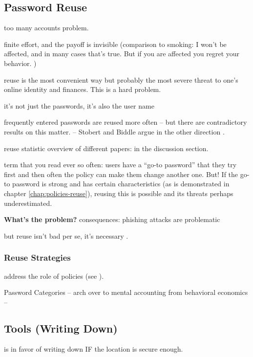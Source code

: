 	


	\subsection{Password Reuse}
	too many accounts problem. 
	
	finite effort, and the payoff is invisible (comparison to smoking: I won't be affected, and in many cases that's true. But if you are affected you regret your behavior. )
	
	reuse is the most convenient way but probably the most severe threat to one's online identity and finances. This is a hard problem. 
	
	it's not just the passwords, it's also the user name 
	
	frequently entered passwords are reused more often \cite{Wash2016UnderstandingPasswordChoices} -- but there are contradictory results on this matter. -- Stobert and Biddle argue in the other direction \cite{Stobert2014PasswordLifeCycle}. 
	
	reuse statistic overview of different papers: \cite{Wash2016UnderstandingPasswordChoices} in the discussion section. 
	
	term that you read ever so often: users have a ``go-to password'' that they try first
	and then often the policy can make them change another one. But! If the go-to password is strong and has certain characteristics (as is demonstrated in chapter \ref{chap:policies-reuse}), reusing this is possible and its threats perhaps underestimated. 
	
	\textbf{What's the problem?}
	consequences: phishing attacks are problematic
	
	but reuse isn't bad per se, it's necessary \cite{Florencio2014PasswordPortfoliosFiniteUser, ZhangKennedy2016RevisitingPasswordRules}. 
	
	
	
	
	\subsubsection{Reuse Strategies}
	address the role of policies (see \cite{Seitz2017PoliciesReuse}).
	
	Password Categories -- arch over to mental accounting from behavioral economics -- \cite{Thaler2004}
	
	\cite{Stobert2015ExpertPassword}
	
	
	\subsection{Tools (Writing Down)}
	\cite{Herley2012PersistenceOfPasswords} is in favor of writing down IF the location is secure enough.
	
